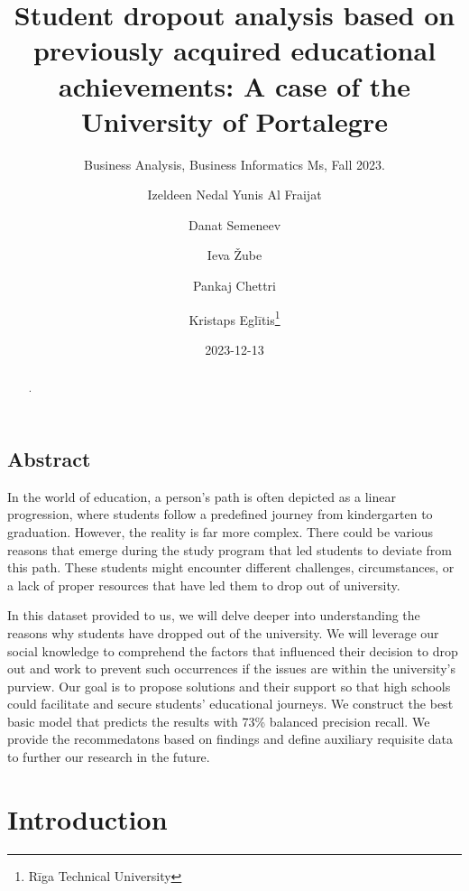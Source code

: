 \documentclass[
  letterpaper,
  DIV=11,
  numbers=noendperiod]{scrartcl}
\title{Student dropout analysis based on previously acquired educational
achievements: A case of the University of Portalegre}
\subtitle{Business Analysis, Business Informatics Ms, Fall 2023.}
\author{Izeldeen Nedal Yunis Al Fraijat \and Danat Semeneev \and Ieva
Žube \and Pankaj Chettri \and Kristaps Eglītis\footnote{Rīga Technical
  University}}
\date{2023-12-13}
\begin{document}
\maketitle
\begin{abstract}
.
\end{abstract}
\ifdefined\Shaded\renewenvironment{Shaded}{\begin{tcolorbox}[sharp corners, borderline west={3pt}{0pt}{shadecolor}, frame hidden, boxrule=0pt, interior hidden, enhanced, breakable]}{\end{tcolorbox}}\fi

\hypertarget{abstract}{%
\subsection{Abstract}\label{abstract}}

In the world of education, a person's path is often depicted as a linear
progression, where students follow a predefined journey from
kindergarten to graduation. However, the reality is far more complex.
There could be various reasons that emerge during the study program that
led students to deviate from this path. These students might encounter
different challenges, circumstances, or a lack of proper resources that
have led them to drop out of university.

In this dataset provided to us, we will delve deeper into understanding
the reasons why students have dropped out of the university. We will
leverage our social knowledge to comprehend the factors that influenced
their decision to drop out and work to prevent such occurrences if the
issues are within the university's purview. Our goal is to propose
solutions and their support so that high schools could facilitate and
secure students' educational journeys. We construct the best basic model
that predicts the results with 73\% balanced precision recall. We
provide the recommedatons based on findings and define auxiliary
requisite data to further our research in the future.

\hypertarget{introduction}{%
\section{Introduction}\label{introduction}}
\end{document}

